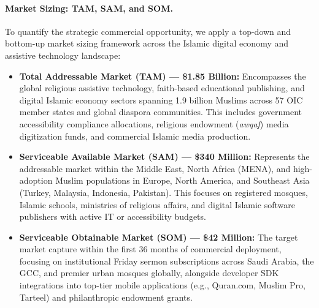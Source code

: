 \paragraph{Market Sizing: TAM, SAM, and SOM.}
To quantify the strategic commercial opportunity, we apply a top-down and bottom-up market sizing framework across the Islamic digital economy and assistive technology landscape:
\begin{itemize}[leftmargin=*,itemsep=3pt]
  \item \textbf{Total Addressable Market (TAM) --- \$1.85 Billion:} Encompasses the global religious assistive technology, faith-based educational publishing, and digital Islamic economy sectors spanning 1.9 billion Muslims across 57 OIC member states and global diaspora communities. This includes government accessibility compliance allocations, religious endowment (\textit{awqaf}) media digitization funds, and commercial Islamic media production.
  \item \textbf{Serviceable Available Market (SAM) --- \$340 Million:} Represents the addressable market within the Middle East, North Africa (MENA), and high-adoption Muslim populations in Europe, North America, and Southeast Asia (Turkey, Malaysia, Indonesia, Pakistan). This focuses on registered mosques, Islamic schools, ministries of religious affairs, and digital Islamic software publishers with active IT or accessibility budgets.
  \item \textbf{Serviceable Obtainable Market (SOM) --- \$42 Million:} The target market capture within the first 36 months of commercial deployment, focusing on institutional Friday sermon subscriptions across Saudi Arabia, the GCC, and premier urban mosques globally, alongside developer SDK integrations into top-tier mobile applications (e.g., Quran.com, Muslim Pro, Tarteel) and philanthropic endowment grants.
\end{itemize}

